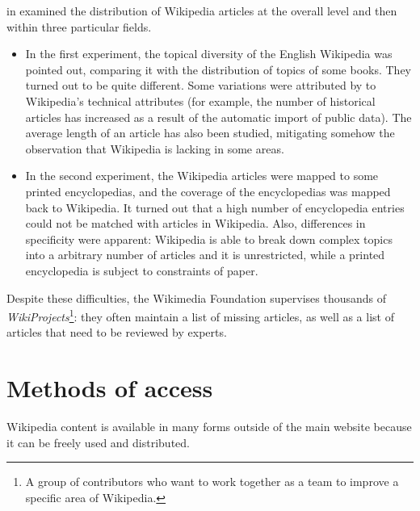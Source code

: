         \citeauthor{Halavais} in \cite{Halavais} examined the distribution of Wikipedia articles at the overall level and then within three particular fields.
        \begin{itemize}
            \item In the first experiment, the topical diversity of the English Wikipedia was pointed out, comparing it with the distribution of topics of some books. They turned out to be quite different. Some variations were attributed by \citeauthor{Halavais} to Wikipedia's technical attributes (for example, the number of historical articles has increased as a result of the automatic import of public data). The average length of an article has also been studied, mitigating somehow the observation that Wikipedia is lacking in some areas.
            \item In the second experiment, the Wikipedia articles were mapped to some printed encyclopedias, and the coverage of the encyclopedias was mapped back to Wikipedia. It turned out that a high number of encyclopedia entries could not be matched with articles in Wikipedia. Also, differences in specificity were apparent: Wikipedia is able to break down complex topics into a arbitrary number of articles and it is unrestricted, while a printed encyclopedia is subject to constraints of paper.
        \end{itemize}
        
        Despite these difficulties, the Wikimedia Foundation supervises thousands of \emph{WikiProjects}\footnote{A group of contributors who want to work together as a team to improve a specific area of Wikipedia.}: they often maintain a list of missing articles, as well as a list of articles that need to be reviewed by experts.
    \section{Methods of access}
        Wikipedia content is available in many forms outside of the main website because it can be freely used and distributed.
